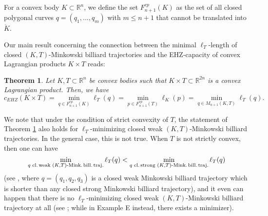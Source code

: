 \documentclass[12pt]{amsart}
\newtheorem{theorem}{Theorem}[section]
\theoremstyle{plain}
\theoremstyle{remark}
\theoremstyle{definition}
\newcommand{\R}{\mathbb{R}}
\def\bthm{\begin{theorem}}\def\ethm{\end{theorem}}
\def\beqq{\begin{equation*}}\def\eeqq{\end{equation*}}
\begin{document}
For a convex body $K\subset\R^n$, we define the set $F_{n+1}^{cp}(K)$ as the set of all closed polygonal curves $q=(q_1,...,q_m)$ with $m\leq n+1$ that cannot be translated into $\mathring{K}$.

Our main result concerning the connection between the minimal $\ell_T$-length of closed $(K,T)$-Minkowski billiard trajectories and the EHZ-capacity of convex Lagrangian products $K\times T$ reads:

\bthm\label{Thm:relationship}
Let $K,T\subset\R^n$ be convex bodies such that $K\times T\subset\R^{2n}$ is a convex Lagrangian product. Then, we have
\beqq c_{EHZ}(K\times T) = \min_{q\in F_{n+1}^{cp}(K)}\ell_T(q) = \min_{p\in F_{n+1}^{cp}(T)}\ell_K(p) = \min_{q \in M_{n+1}(K,T)} \ell_T(q).\eeqq
\ethm

We note that under the condition of strict convexity of $T$, the statement of Theorem \ref{Thm:relationship} also holds for $\ell_T$-minimizing closed weak $(K,T)$-Minkowski billiard trajectories. In the general case, this is not true. When $T$ is not strictly convex, then one can have
\beqq\min_{q \text{ cl.\,weak }(K,T)\text{-Mink.\,bill.\,traj.}} \ell_T(q) < \min_{q \text{ cl.\,strong }(K,T)\text{-Mink.\,bill.\,traj.}} \ell_T(q)\eeqq
(see \cite[Example E]{KruppRudolf2022}, where $q=(q_1,q_2,q_3)$ is a closed weak Minkowski billiard trajectory which is shorter than any closed strong Minkowski billiard trajectory), and it even can happen that there is no $\ell_T$-minimizing closed weak $(K,T)$-Minkowski billiard trajectory at all (see \cite[Example G]{KruppRudolf2022}; while in Example E instead, there exists a minimizer).
\end{document}

